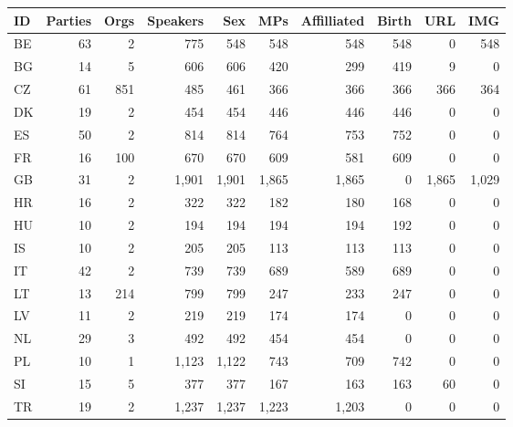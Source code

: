 \begin{tabular}{l|rrrrrrrrr}
ID&Parties&Orgs&Speakers&Sex&MPs&Affilliated&Birth&URL&IMG\\
\hline
BE&63&2&775&548&548&548&548&0&548\\
BG&14&5&606&606&420&299&419&9&0\\
CZ&61&851&485&461&366&366&366&366&364\\
DK&19&2&454&454&446&446&446&0&0\\
ES&50&2&814&814&764&753&752&0&0\\
FR&16&100&670&670&609&581&609&0&0\\
GB&31&2&1,901&1,901&1,865&1,865&0&1,865&1,029\\
HR&16&2&322&322&182&180&168&0&0\\
HU&10&2&194&194&194&194&192&0&0\\
IS&10&2&205&205&113&113&113&0&0\\
IT&42&2&739&739&689&589&689&0&0\\
LT&13&214&799&799&247&233&247&0&0\\
LV&11&2&219&219&174&174&0&0&0\\
NL&29&3&492&492&454&454&0&0&0\\
PL&10&1&1,123&1,122&743&709&742&0&0\\
SI&15&5&377&377&167&163&163&60&0\\
TR&19&2&1,237&1,237&1,223&1,203&0&0&0\\
\end{tabular}
